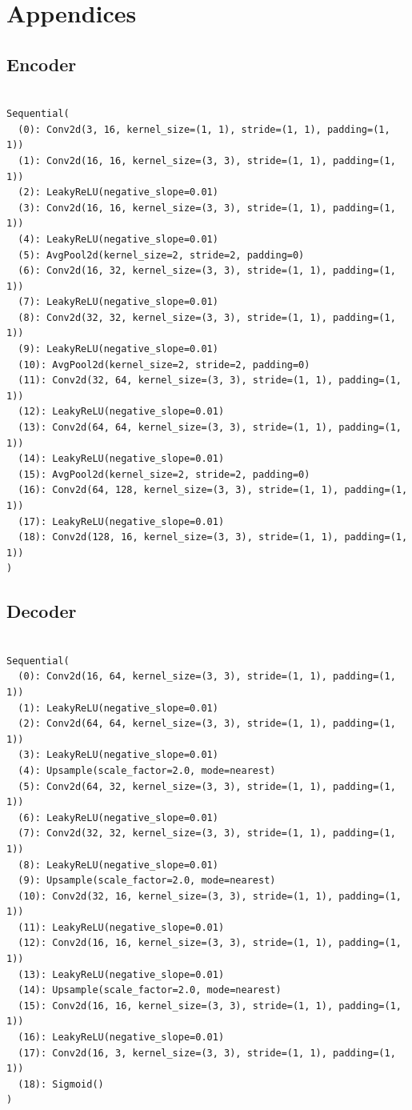 \documentclass[11pt]{article} %
\begin{document}
\clearpage
\section{Appendices}

\subsection{Encoder}

\begin{verbatim}

Sequential(
  (0): Conv2d(3, 16, kernel_size=(1, 1), stride=(1, 1), padding=(1, 1))
  (1): Conv2d(16, 16, kernel_size=(3, 3), stride=(1, 1), padding=(1, 1))
  (2): LeakyReLU(negative_slope=0.01)
  (3): Conv2d(16, 16, kernel_size=(3, 3), stride=(1, 1), padding=(1, 1))
  (4): LeakyReLU(negative_slope=0.01)
  (5): AvgPool2d(kernel_size=2, stride=2, padding=0)
  (6): Conv2d(16, 32, kernel_size=(3, 3), stride=(1, 1), padding=(1, 1))
  (7): LeakyReLU(negative_slope=0.01)
  (8): Conv2d(32, 32, kernel_size=(3, 3), stride=(1, 1), padding=(1, 1))
  (9): LeakyReLU(negative_slope=0.01)
  (10): AvgPool2d(kernel_size=2, stride=2, padding=0)
  (11): Conv2d(32, 64, kernel_size=(3, 3), stride=(1, 1), padding=(1, 1))
  (12): LeakyReLU(negative_slope=0.01)
  (13): Conv2d(64, 64, kernel_size=(3, 3), stride=(1, 1), padding=(1, 1))
  (14): LeakyReLU(negative_slope=0.01)
  (15): AvgPool2d(kernel_size=2, stride=2, padding=0)
  (16): Conv2d(64, 128, kernel_size=(3, 3), stride=(1, 1), padding=(1, 1))
  (17): LeakyReLU(negative_slope=0.01)
  (18): Conv2d(128, 16, kernel_size=(3, 3), stride=(1, 1), padding=(1, 1))
)

\end{verbatim}

\clearpage
\subsection{Decoder}

\begin{verbatim}

Sequential(
  (0): Conv2d(16, 64, kernel_size=(3, 3), stride=(1, 1), padding=(1, 1))
  (1): LeakyReLU(negative_slope=0.01)
  (2): Conv2d(64, 64, kernel_size=(3, 3), stride=(1, 1), padding=(1, 1))
  (3): LeakyReLU(negative_slope=0.01)
  (4): Upsample(scale_factor=2.0, mode=nearest)
  (5): Conv2d(64, 32, kernel_size=(3, 3), stride=(1, 1), padding=(1, 1))
  (6): LeakyReLU(negative_slope=0.01)
  (7): Conv2d(32, 32, kernel_size=(3, 3), stride=(1, 1), padding=(1, 1))
  (8): LeakyReLU(negative_slope=0.01)
  (9): Upsample(scale_factor=2.0, mode=nearest)
  (10): Conv2d(32, 16, kernel_size=(3, 3), stride=(1, 1), padding=(1, 1))
  (11): LeakyReLU(negative_slope=0.01)
  (12): Conv2d(16, 16, kernel_size=(3, 3), stride=(1, 1), padding=(1, 1))
  (13): LeakyReLU(negative_slope=0.01)
  (14): Upsample(scale_factor=2.0, mode=nearest)
  (15): Conv2d(16, 16, kernel_size=(3, 3), stride=(1, 1), padding=(1, 1))
  (16): LeakyReLU(negative_slope=0.01)
  (17): Conv2d(16, 3, kernel_size=(3, 3), stride=(1, 1), padding=(1, 1))
  (18): Sigmoid()
)

\end{verbatim}
\end{document}
